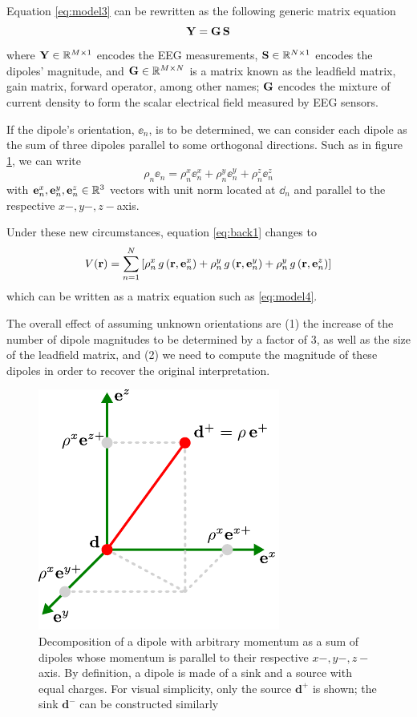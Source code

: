 Equation \eqref{eq:model3} can be rewritten as the following generic matrix equation
\begin{equation}
\mathbf{Y} = \mathbf{G}\, \mathbf{S}
\label{eq:model4}
\end{equation}
where $\mathbf{Y} \in \mathbb{R}^{M\times 1}$ encodes the EEG measurements, $\mathbf{S} \in \mathbb{R}^{N\times 1}$ encodes the dipoles' magnitude, and $\mathbf{G} \in \mathbb{R}^{M\times N}$ is a matrix known as the leadfield matrix, gain matrix, forward operator, among other names; $\mathbf{G}$ encodes the mixture of current density to form the scalar electrical field measured by EEG sensors.



If the dipole's orientation, $\ee_n$, is to be determined, we can consider each dipole as the sum of three dipoles parallel to some orthogonal directions. Such as in figure \ref{fig:diagrams3}, we can write
\begin{equation}
\rho_n \ee_n = \rho^x_n \ee_n^x + \rho_n^y \ee_n^y + \rho_n^z \ee_n^z
\end{equation}
with $\mathbf{e}_n^x, \mathbf{e}_n^y, \mathbf{e}_n^z \in \mathbb{R}^3$ vectors with unit norm located at $\dd_n$ and parallel to the respective $x-, y-, z-$axis.
%

Under these new circumstances, equation \eqref{eq:back1} changes to
\begin{equation}
V(\mathbf{r}) = 
\sum_{n=1}^N 
\left[ 
\rho_n^x\, g\left( \mathbf{r}, \mathbf{e}_n^x \right) +
\rho_n^y\, g\left( \mathbf{r}, \mathbf{e}_n^y \right) +
\rho_n^y\, g\left( \mathbf{r}, \mathbf{e}_n^z \right)
 \right]
\end{equation}
which can be written as a matrix equation such as \eqref{eq:model4}.

The overall effect of assuming unknown orientations are (1) the increase of the number of dipole magnitudes to be determined by a factor of 3, as well as the size of the leadfield matrix, and (2)
we need to compute the magnitude of these dipoles in order to recover the original interpretation.

\begin{figure}[ht]
\centering
\includegraphics[scale=1.2]{./img/OrthDecomp}
\caption{Decomposition of a dipole with arbitrary momentum as a sum of dipoles whose momentum is parallel to their respective $x-, y-, z-$axis. By definition, a dipole is made of a sink and a source with equal charges. For visual simplicity, only the source $\mathbf{d}^+$ is shown; the sink $\mathbf{d}^-$ can be constructed similarly}
\label{fig:diagrams3}
\end{figure}

